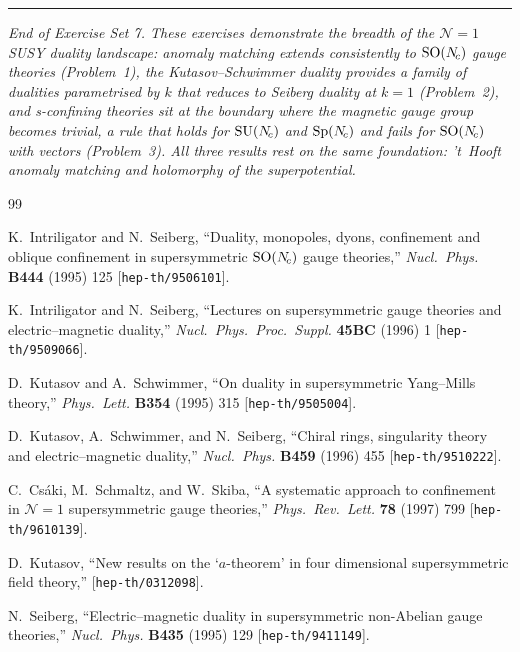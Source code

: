\documentclass[11pt,a4paper]{article}
\newcommand{\SO}[1]{\mathrm{SO}(#1)}
\newcommand{\Sp}[1]{\mathrm{Sp}(#1)}
\begin{document}
\bigskip

\begin{center}
\rule{0.6\textwidth}{0.4pt}

\textit{End of Exercise Set 7.  These exercises demonstrate the
breadth of the $\mathcal{N}=1$ SUSY duality landscape: anomaly
matching extends consistently to $\SO{\Nc}$ gauge theories
(Problem~1), the Kutasov--Schwimmer duality provides a family of
dualities parametrised by $k$ that reduces to Seiberg duality at
$k = 1$ (Problem~2), and s-confining theories sit at the boundary
where the magnetic gauge group becomes trivial, a rule that holds for
$\mathrm{SU}(N_{\!c})$ and $\Sp{\Nc}$ and fails for $\SO{\Nc}$ with vectors
(Problem~3).  All
three results rest on the same foundation: 't~Hooft anomaly matching
and holomorphy of the superpotential.}
\end{center}


\begin{thebibliography}{99}

  K.~Intriligator and N.~Seiberg,
  ``Duality, monopoles, dyons, confinement and oblique confinement
  in supersymmetric $\SO{\Nc}$ gauge theories,''
  \textit{Nucl.\ Phys.} \textbf{B444} (1995) 125
  [\texttt{hep-th/9506101}].

  K.~Intriligator and N.~Seiberg,
  ``Lectures on supersymmetric gauge theories and electric--magnetic
  duality,''
  \textit{Nucl.\ Phys.\ Proc.\ Suppl.} \textbf{45BC} (1996) 1
  [\texttt{hep-th/9509066}].

  D.~Kutasov and A.~Schwimmer,
  ``On duality in supersymmetric Yang--Mills theory,''
  \textit{Phys.\ Lett.} \textbf{B354} (1995) 315
  [\texttt{hep-th/9505004}].

  D.~Kutasov, A.~Schwimmer, and N.~Seiberg,
  ``Chiral rings, singularity theory and electric--magnetic duality,''
  \textit{Nucl.\ Phys.} \textbf{B459} (1996) 455
  [\texttt{hep-th/9510222}].

  C.~Cs\'aki, M.~Schmaltz, and W.~Skiba,
  ``A systematic approach to confinement in $\mathcal{N}=1$
  supersymmetric gauge theories,''
  \textit{Phys.\ Rev.\ Lett.} \textbf{78} (1997) 799
  [\texttt{hep-th/9610139}].

  D.~Kutasov,
  ``New results on the `$a$-theorem' in four dimensional
  supersymmetric field theory,''
  [\texttt{hep-th/0312098}].

  N.~Seiberg,
  ``Electric--magnetic duality in supersymmetric non-Abelian gauge
  theories,''
  \textit{Nucl.\ Phys.} \textbf{B435} (1995) 129
  [\texttt{hep-th/9411149}].

\end{thebibliography}
\end{document}
